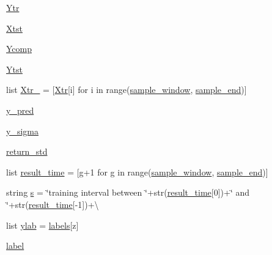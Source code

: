 \begin{DoxyCompactItemize}
\item 
\mbox{\hyperlink{namespacetime__series2_a048fc1f5052ecd0ac42a809d13599ff0}{Ytr}}
\item 
\mbox{\hyperlink{namespacetime__series2_aff22e5d05c2a50ecb36a4f87019d31fb}{Xtst}}
\item 
\mbox{\hyperlink{namespacetime__series2_af29c132f3c4ad21f3ce71ca94bd5e811}{Ycomp}}
\item 
\mbox{\hyperlink{namespacetime__series2_ad545baebbafca44d770c7184debd3ebb}{Ytst}}
\item 
list \mbox{\hyperlink{namespacetime__series2_a22428a1c2732c1fe95c8f9bc060b1a56}{Xtr\+\_}} = \mbox{[}\mbox{\hyperlink{namespacetime__series2_a9ad02e52f2e578dff25a50245476fb4d}{Xtr}}\mbox{[}i\mbox{]} for i in range(\mbox{\hyperlink{namespacetime__series2_abbcc8a8aa4c18c3850b74368b2728790}{sample\+\_\+window}}, \mbox{\hyperlink{namespacetime__series2_ad170197f80cacfa1a597f0cc81af1ed5}{sample\+\_\+end}})\mbox{]}
\item 
\mbox{\hyperlink{namespacetime__series2_adc3835a1aee5e6024fcf327d2fac0f08}{y\+\_\+pred}}
\item 
\mbox{\hyperlink{namespacetime__series2_a41dcf5a15bbf43705317edb2c4917073}{y\+\_\+sigma}}
\item 
\mbox{\hyperlink{namespacetime__series2_a6438463f77ead66c93e77557813fc843}{return\+\_\+std}}
\item 
list \mbox{\hyperlink{namespacetime__series2_a8bc1ba75be8714303adfe853be1fdfa7}{result\+\_\+time}} = \mbox{[}g+1 for g in range(\mbox{\hyperlink{namespacetime__series2_abbcc8a8aa4c18c3850b74368b2728790}{sample\+\_\+window}}, \mbox{\hyperlink{namespacetime__series2_ad170197f80cacfa1a597f0cc81af1ed5}{sample\+\_\+end}})\mbox{]}
\item 
string \mbox{\hyperlink{namespacetime__series2_a1cde44ae6d15f2025f459a56910bb627}{s}} = \char`\"{}training interval between \char`\"{}+str(\mbox{\hyperlink{namespacetime__series2_a8bc1ba75be8714303adfe853be1fdfa7}{result\+\_\+time}}\mbox{[}0\mbox{]})+\char`\"{} and \char`\"{}+str(\mbox{\hyperlink{namespacetime__series2_a8bc1ba75be8714303adfe853be1fdfa7}{result\+\_\+time}}\mbox{[}-\/1\mbox{]})+\textbackslash{}
\item 
list \mbox{\hyperlink{namespacetime__series2_aede1d0cfe7385a32db06215b98af807c}{ylab}} = \mbox{\hyperlink{namespacetime__series2_aca78083d23e0850ea4120fa6817af6fb}{labels}}\mbox{[}z\mbox{]}
\item 
\mbox{\hyperlink{namespacetime__series2_adf5da4818165639941e8e5fbd59b8079}{label}}
\item 

\end{DoxyCompactItemize}
